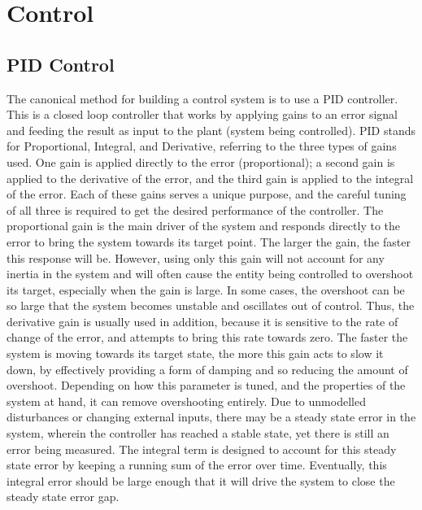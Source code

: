 \documentclass[letterpaper,12pt,titlepage,oneside,final]{book}
\begin{document}
\chapter{Control} \label{chap:control}

\section{PID Control}


The canonical method for building a control system is to use a PID controller. 
This is a closed loop controller that works by applying gains to an error signal and feeding the result as input to the plant (system being controlled). 
PID stands for Proportional, Integral, and Derivative, referring to the three types of gains used. 
One gain is applied directly to the error (proportional); a second gain is applied to the derivative of the error, and the third gain is applied to the integral of the error. 
Each of these gains serves a unique purpose, and the careful tuning of all three is required to get the desired performance of the controller. 
The proportional gain is the main driver of the system and responds directly to the error to bring the system towards its target point. 
The larger the gain, the faster this response will be.
However, using only this gain will not account for any inertia in the system and will often cause the entity being controlled to overshoot its target, especially when the gain is large. 
In some cases, the overshoot can be so large that the system becomes unstable and oscillates out of control.
Thus, the derivative gain is usually used in addition, because it is sensitive to the rate of change of the error, and attempts to bring this rate towards zero. 
The faster the system is moving towards its target state, the more this gain acts to slow it down, by effectively providing a form of damping and so reducing the amount of overshoot.
Depending on how this parameter is tuned, and the properties of the system at hand, it can remove overshooting entirely. 
Due to unmodelled disturbances or changing external inputs, there may be a steady state error in the system, wherein the controller has reached a stable state, yet there is still an error being measured. 
The integral term is designed to account for this steady state error by keeping a running sum of the error over time. 
Eventually, this integral error should be large enough that it will drive the system to close the steady state error gap.
\end{document}
